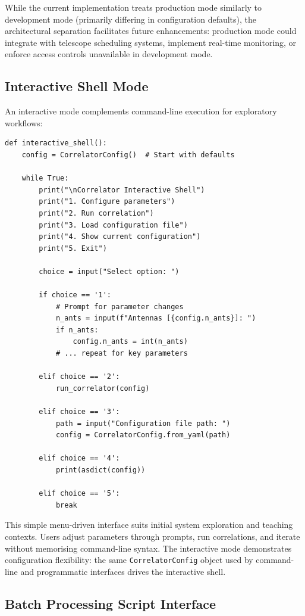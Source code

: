 While the current implementation treats production mode similarly to development mode (primarily differing in configuration defaults), the architectural separation facilitates future enhancements: production mode could integrate with telescope scheduling systems, implement real-time monitoring, or enforce access controls unavailable in development mode.

\subsection{Interactive Shell Mode}

An interactive mode complements command-line execution for exploratory workflows:

\begin{verbatim}
def interactive_shell():
    config = CorrelatorConfig()  # Start with defaults
    
    while True:
        print("\nCorrelator Interactive Shell")
        print("1. Configure parameters")
        print("2. Run correlation")
        print("3. Load configuration file")
        print("4. Show current configuration")
        print("5. Exit")
        
        choice = input("Select option: ")
        
        if choice == '1':
            # Prompt for parameter changes
            n_ants = input(f"Antennas [{config.n_ants}]: ")
            if n_ants:
                config.n_ants = int(n_ants)
            # ... repeat for key parameters
        
        elif choice == '2':
            run_correlator(config)
        
        elif choice == '3':
            path = input("Configuration file path: ")
            config = CorrelatorConfig.from_yaml(path)
        
        elif choice == '4':
            print(asdict(config))
        
        elif choice == '5':
            break
\end{verbatim}

This simple menu-driven interface suits initial system exploration and teaching contexts. Users adjust parameters through prompts, run correlations, and iterate without memorising command-line syntax. The interactive mode demonstrates configuration flexibility: the same \texttt{CorrelatorConfig} object used by command-line and programmatic interfaces drives the interactive shell.

\subsection{Batch Processing Script Interface}

